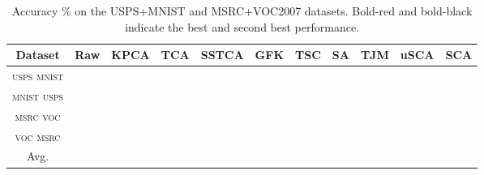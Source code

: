 \documentclass[10pt,journal,compsoc]{IEEEtran}
\begin{document}
\begin{table*}[!htb]
    \caption{Accuracy \% on the USPS+MNIST and MSRC+VOC2007 datasets.
    Bold-red and bold-black indicate the best and second best performance.
    }
    \vspace{-1em}
    \centering
\begin{tabular}{| c || c | c | c | c | c | c | c | c | c | c |}
    \hline
    Dataset & Raw & KPCA & TCA & SSTCA &GFK & TSC & SA &  TJM & uSCA & SCA \\
    \hline
    
    \textsc{usps}  \textsc{mnist} & 
       &   &  &  &  &  &  & {\color{red}} & &  \\
      
    \textsc{mnist}  \textsc{usps} & 
       &  &  &  &  &  &  &  &  & {\color{red} } \\
    
    \textsc{msrc}  \textsc{voc} & 
       &  &  &  &  &  &  & & {\color{red} } &  \\
    
    \textsc{voc}  \textsc{msrc} & 
       &  &  &  &  &  &  &  &  {\color{red} } &  \\
    
    \hline
    \hline
    
    Avg. &  &  &  &  &  &  &  &  &  & {\color{red} }\\
    
    \hline
    \end{tabular}
\label{tab:exp1_results_cv}
\end{table*}
\end{document}

